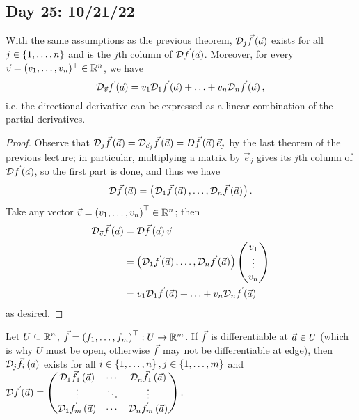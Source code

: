 \documentclass[main.tex]{subfiles}
\begin{document}
\subsection{Day 25: 10/21/22}
\begin{theorem}
    With the same assumptions as the previous theorem, $\mathcal{D}_j\vec{f}\left( \vec{a} \right)$ exists for all $j\in \left\{ 1, \ldots , n \right\}$ and is the $j$th column of $\mathcal{D}\vec{f}\left( \vec{a} \right)$. Moreover, for every $\vec{v} = (v_1, \ldots , v_n)^\top\in \mathbb R^n$, we have
    \[\mathcal{D}_{\vec{v}} \vec{f}\left( \vec{a} \right) = v_1 \mathcal{D}_1\vec{f}\left( \vec{a} \right) + \ldots + v_n\mathcal{D}_n\vec{f}\left( \vec{a} \right),\]
    i.e. the directional derivative can be expressed as a linear combination of the partial derivatives.
\end{theorem}
\begin{proof}
    Observe that $\mathcal{D}_j\vec{f}\left( \vec{a} \right) = \mathcal{D}_{\vec{e}_j}\vec{f}\left( \vec{a} \right) = D\vec{f}\left( \vec{a} \right)\vec{e}_j$ by the last theorem of the previous lecture; in particular, multiplying a matrix by $\vec{e}_j$ gives its $j$th column of $\mathcal{D}\vec{f}\left( \vec{a} \right)$, so the first part is done, and thus we have
    \[\mathcal{D}\vec{f}\left( \vec{a} \right) = \left( \mathcal{D}_1\vec{f}\left( \vec{a} \right), \ldots , \mathcal{D}_n\vec{f}\left( \vec{a} \right) \right).\]
    Take any vector $\vec{v} = \left( v_1, \ldots , v_n \right)^\top\in \mathbb R^n$; then
    \begin{align*}
        \mathcal{D}_{\vec{v}}\vec{f}\left( \vec{a} \right) &= \mathcal{D}\vec{f}\left( \vec{a} \right)\vec{v} \\
        &= \left( \mathcal{D}_1\vec{f}\left( \vec{a} \right), \ldots , \mathcal{D}_n\vec{f}\left( \vec{a} \right) \right)\begin{pmatrix} v_1 \\ \vdots \\ v_n\end{pmatrix} \\
        &= v_1\mathcal{D}_1\vec{f}\left( \vec{a} \right) + \ldots + v_n\mathcal{D}_n\vec{f}\left( \vec{a} \right)
    \end{align*}
    as desired.
\end{proof}

\begin{remark}
    Let $U\subseteq \mathbb R^n$, $\vec{f} = \left( f_1, \ldots , f_m \right)^\top : U \to \mathbb R^m$. If $\vec{f}$ is differentiable at $\vec{a}\in U$ (which is why $U$ must be open, otherwise $\vec{f}$ may not be differentiable at edge), then $\mathcal{D}_j\vec{f}_i\left( \vec{a} \right)$ exists for all $i \in \left\{ 1, \ldots , n \right\}, j\in \left\{ 1, \ldots , m \right\}$ and $\mathcal{D}\vec{f}\left( \vec{a} \right) = \begin{pmatrix}
        \mathcal{D}_1\vec{f}_1\left( \vec{a} \right) & \cdots & \mathcal{D}_n\vec{f}_1\left( \vec{a} \right) \\
        \vdots & \ddots & \vdots \\
        \mathcal{D}_1\vec{f}_m\left( \vec{a} \right) & \cdots & \mathcal{D}_n\vec{f}_m\left( \vec{a} \right)
    \end{pmatrix}.$
\end{remark}
\end{document}
